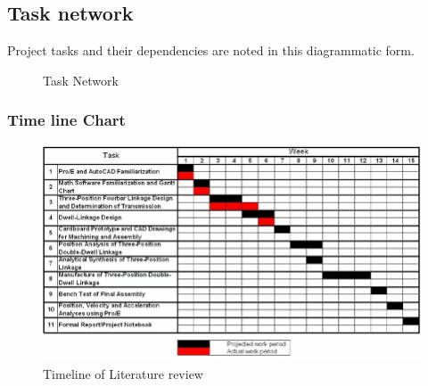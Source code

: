 \subsection{Task network}  
Project tasks and their dependencies are noted in this diagrammatic form.
\begin{center}
	\begin{figure}[!h]
		\centering
		\caption{Task Network}
		\label{fig:Task Network}
	\end{figure}
\end{center}
\subsubsection{Time line Chart}

\begin{figure}[h]
\centering
\includegraphics[width = \textwidth]{./sem1plan}
\caption{Timeline of Literature review}
\end{figure}

